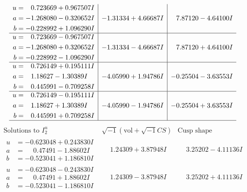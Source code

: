 \documentclass[1p]{elsarticle_modified}
\theoremstyle{definition}
\newcommand{\I}{\sqrt{-1}}
\begin{document}
$$\begin{array}{c|c|c}
\begin{aligned}
u &= \phantom{-}0.723669 + 0.967507 I \\
a &= -1.268080 - 0.320652 I \\
b &= -0.228992 + 1.096290 I\end{aligned}
 & -1.31334 + 4.66687 I & \phantom{-}7.87120 - 4.64100 I \\ \hline\begin{aligned}
u &= \phantom{-}0.723669 - 0.967507 I \\
a &= -1.268080 + 0.320652 I \\
b &= -0.228992 - 1.096290 I\end{aligned}
 & -1.31334 - 4.66687 I & \phantom{-}7.87120 + 4.64100 I \\ \hline\begin{aligned}
u &= \phantom{-}0.726149 + 0.195111 I \\
a &= \phantom{-}1.18627 - 1.30389 I \\
b &= \phantom{-}0.445991 - 0.709258 I\end{aligned}
 & -4.05990 + 1.94786 I & -0.25504 - 3.63553 I \\ \hline\begin{aligned}
u &= \phantom{-}0.726149 - 0.195111 I \\
a &= \phantom{-}1.18627 + 1.30389 I \\
b &= \phantom{-}0.445991 + 0.709258 I\end{aligned}
 & -4.05990 - 1.94786 I & -0.25504 + 3.63553 I\\
 \hline 
 \end{array}$$\newpage$$\begin{array}{c|c|c}  
\text{Solutions to }I^u_{2}& \I (\text{vol} + \sqrt{-1}CS) & \text{Cusp shape}\\
 \hline 
\begin{aligned}
u &= -0.623048 + 0.243830 I \\
a &= \phantom{-}0.47491 - 1.88602 I \\
b &= -0.523041 + 1.186810 I\end{aligned}
 & \phantom{-}1.24309 + 3.87948 I & \phantom{-}3.25202 - 4.11136 I \\ \hline\begin{aligned}
u &= -0.623048 - 0.243830 I \\
a &= \phantom{-}0.47491 + 1.88602 I \\
b &= -0.523041 - 1.186810 I\end{aligned}
 & \phantom{-}1.24309 - 3.87948 I & \phantom{-}3.25202 + 4.11136 I \\ \hline\begin{aligned}

\end{aligned}
\end{array}$$
\end{document}
